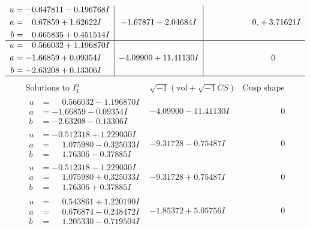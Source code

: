 \documentclass[1p]{elsarticle_modified}
\theoremstyle{definition}
\newcommand{\I}{\sqrt{-1}}
\begin{document}
$$\begin{array}{c|c|c}
\begin{aligned}
u &= -0.647811 - 0.196768 I \\
a &= \phantom{-}0.67859 + 1.62622 I \\
b &= \phantom{-}0.665835 + 0.451514 I\end{aligned}
 & -1.67871 - 2.04684 I & \phantom{-0.000000 -}0. + 3.71621 I \\ \hline\begin{aligned}
u &= \phantom{-}0.566032 + 1.196870 I \\
a &= -1.66859 + 0.09354 I \\
b &= -2.63208 + 0.13306 I\end{aligned}
 & -4.09900 + 11.41130 I & \phantom{-0.000000 } 0\\
 \hline 
 \end{array}$$\newpage$$\begin{array}{c|c|c}  
\text{Solutions to }I^u_{1}& \I (\text{vol} + \sqrt{-1}CS) & \text{Cusp shape}\\
 \hline 
\begin{aligned}
u &= \phantom{-}0.566032 - 1.196870 I \\
a &= -1.66859 - 0.09354 I \\
b &= -2.63208 - 0.13306 I\end{aligned}
 & -4.09900 - 11.41130 I & \phantom{-0.000000 } 0 \\ \hline\begin{aligned}
u &= -0.512318 + 1.229030 I \\
a &= \phantom{-}1.075980 - 0.325033 I \\
b &= \phantom{-}1.76306 - 0.37885 I\end{aligned}
 & -9.31728 - 0.75487 I & \phantom{-0.000000 } 0 \\ \hline\begin{aligned}
u &= -0.512318 - 1.229030 I \\
a &= \phantom{-}1.075980 + 0.325033 I \\
b &= \phantom{-}1.76306 + 0.37885 I\end{aligned}
 & -9.31728 + 0.75487 I & \phantom{-0.000000 } 0 \\ \hline\begin{aligned}
u &= \phantom{-}0.543861 + 1.220190 I \\
a &= \phantom{-}0.676874 - 0.248472 I \\
b &= \phantom{-}1.205330 - 0.719504 I\end{aligned}
 & -1.85372 + 5.05756 I & \phantom{-0.000000 } 0 \\ \hline\begin{aligned}

\end{aligned}
\end{array}$$
\end{document}
